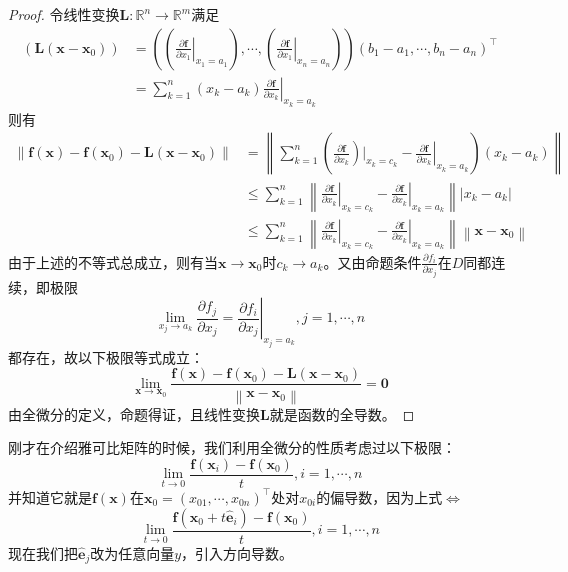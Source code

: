 \documentclass[main.tex]{subfiles}
\begin{document}
\begin{proof}
令线性变换$\mathbf{L}:\mathbb{R}^n\rightarrow \mathbb{R}^m$满足
\begin{align*}
\left(\mathbf{L}\left(\mathbf{x}-\mathbf{x}_0\right)\right)&=\left(\left(\left.\frac{\partial \mathbf{f}}{\partial x_1}\right|_{x_1=a_1}\right),\cdots,\left(\left.\frac{\partial \mathbf{f}}{\partial x_1}\right|_{x_n=a_n}\right)\right)\left(b_1-a_1,\cdots,b_n-a_n\right)^\intercal\\
&=\sum_{k=1}^n\left(x_k-a_k\right)\left.\frac{\partial \mathbf{f}}{\partial x_k}\right|_{x_k=a_k}
\end{align*}
则有
\begin{align*}
    \left\|\mathbf{f}\left(\mathbf{x}\right)-\mathbf{f}\left(\mathbf{x}_0\right)-\mathbf{L}\left(\mathbf{x}-\mathbf{x}_0\right)\right\|&=\left\|\sum_{k=1}^n\left(\left.\frac{\partial \mathbf{f}}{\partial x_k}\right)|_{x_k=c_k}-\left.\frac{\partial \mathbf{f}}{\partial x_k}\right|_{x_k=a_k}\right)\left(x_k-a_k\right)\right\|\\
    &\leq\sum_{k=1}^n\left\|\left.\frac{\partial \mathbf{f}}{\partial x_k}\right|_{x_k=c_k}-\left.\frac{\partial\mathbf{f}}{\partial x_k}\right|_{x_k=a_k}\right\|\left|x_k-a_k\right|\\
    &\leq\sum_{k=1}^n\left\|\left.\frac{\partial\mathbf{f}}{\partial x_k}\right|_{x_k=c_k}-\left.\frac{\partial\mathbf{f}}{\partial x_k}\right|_{x_k=a_k}\right\|\left\|\mathbf{x}-\mathbf{x}_0\right\|
\end{align*}
由于上述的不等式总成立，则有当$\mathbf{x}\to\mathbf{x}_0$时$c_k\to a_k$。又由命题条件$\frac{\partial f_i}{\partial x_j}$在$D$同都连续，即极限
\[
\lim_{x_j\to a_k}\frac{\partial f_j}{\partial x_j}=\left.\frac{\partial f_i}{\partial x_j}\right|_{x_j=a_k},j=1,\cdots,n
\]
都存在，故以下极限等式成立：
\[\lim_{\mathbf{x}\to\mathbf{x}_0}\frac{\mathbf{f}\left(\mathbf{x}\right)-\mathbf{f}\left(\mathbf{x}_0\right)-\mathbf{L}\left(\mathbf{x}-\mathbf{x}_0\right)}{\left\|\mathbf{x}-\mathbf{x}_0\right\|}=\mathbf{0}
\]
由全微分的定义，命题得证，且线性变换$\mathbf{L}$就是函数的全导数。
\end{proof}



刚才在介绍雅可比矩阵的时候，我们利用全微分的性质考虑过以下极限：
\[
\lim_{t\to 0}\frac{\mathbf{f}\left(\mathbf{x}_i\right)-\mathbf{f}\left(\mathbf{x}_0\right)}{t},i=1,\cdots,n\]
并知道它就是$\mathbf{f}\left(\mathbf{x}\right)$在$\mathbf{x}_0=\left(x_{01},\cdots,x_{0n}\right)^\intercal$处对$x_{0i}$的偏导数，因为上式$\Leftrightarrow$
\[
\lim_{t\rightarrow 0}\frac{\mathbf{f}\left(\mathbf{x}_0+t\mathbf{\hat{e}}_i\right)-\mathbf{f}\left(\mathbf{x}_0\right)}{t},i=1,\cdots,n
\]
现在我们把$\mathbf{\hat{e}}_j$改为任意向量$y$，引入方向导数。
\end{document}
